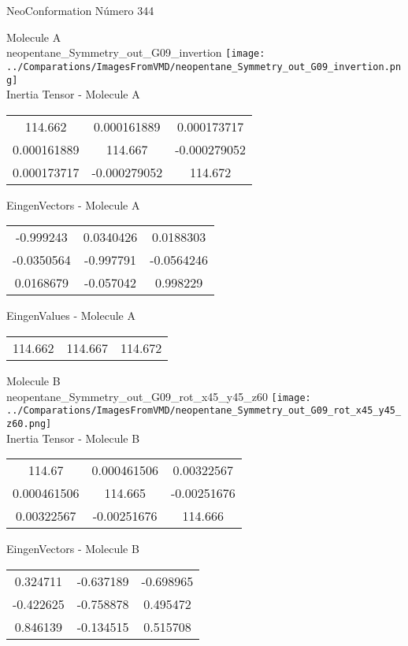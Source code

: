 \vtab[-2cm]
\begin{center}
{\large NeoConformation \tab Número 344}
\end{center}
\begin{multicols}{2}
\begin{center}

Molecule A \\ 
neopentane\_Symmetry\_out\_G09\_invertion
\texttt{[image: ../Comparations/ImagesFromVMD/neopentane\_Symmetry\_out\_G09\_invertion.png]}
\\
Inertia Tensor - Molecule A \\
\vtab

\begin{tabular}{|c c c|}
114.662	 & 	0.000161889	 & 	0.000173717	 \\
0.000161889	 & 	114.667	 & 	-0.000279052	 \\
0.000173717	 & 	-0.000279052	 & 	114.672
\end{tabular}

\vtab
 EingenVectors - Molecule A     \\
\vtab
\begin{tabular}{|c c c|}
-0.999243	 & 	0.0340426	 & 	0.0188303	 \\
-0.0350564	 & 	-0.997791	 & 	-0.0564246	 \\
0.0168679	 & 	-0.057042	 & 	0.998229
\end{tabular}

\vtab
 EingenValues - Molecule A     \\
\vtab
\begin{tabular}{|c c c|}
114.662	 & 	114.667	 & 	114.672	 \\
\end{tabular}
\columnbreak

Molecule B \\ 
neopentane\_Symmetry\_out\_G09\_rot\_x45\_y45\_z60
\texttt{[image: ../Comparations/ImagesFromVMD/neopentane\_Symmetry\_out\_G09\_rot\_x45\_y45\_z60.png]}
\\
Inertia Tensor - Molecule B \\
\vtab

\begin{tabular}{|c c c|}
114.67	 & 	0.000461506	 & 	0.00322567	 \\
0.000461506	 & 	114.665	 & 	-0.00251676	 \\
0.00322567	 & 	-0.00251676	 & 	114.666
\end{tabular}

\vtab
 EingenVectors - Molecule B     \\
\vtab
\begin{tabular}{|c c c|}
0.324711	 & 	-0.637189	 & 	-0.698965	 \\
-0.422625	 & 	-0.758878	 & 	0.495472	 \\
0.846139	 & 	-0.134515	 & 	0.515708
\end{tabular}


\end{center}
\end{multicols}
